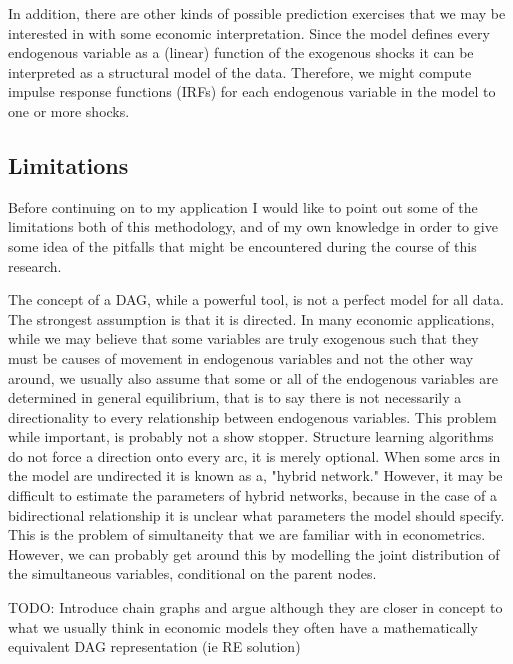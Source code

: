\documentclass{article}
\begin{document}
In addition, there are other kinds of possible prediction exercises that we may be interested in with some economic interpretation. Since the model defines every endogenous variable as a (linear) function of the exogenous shocks it can be interpreted as a structural model of the data. Therefore, we might compute impulse response functions (IRFs) for each endogenous variable in the model to one or more shocks.

\subsection{Limitations}

Before continuing on to my application I would like to point out some of the limitations both of this methodology, and of my own knowledge in order to give some idea of the pitfalls that might be encountered during the course of this research. 

The concept of a DAG, while a powerful tool, is not a perfect model for all data. The strongest assumption is that it is directed. In many economic applications, while we may believe that some variables are truly exogenous such that they must be causes of movement in endogenous variables and not the other way around, we usually also assume that some or all of the endogenous variables are determined in general equilibrium, that is to say there is not necessarily a directionality to every relationship between endogenous variables. This problem while important, is probably not a show stopper. Structure learning algorithms do not force a direction onto every arc, it is merely optional. When some arcs in the model are undirected it is known as a, "hybrid network." However, it may be difficult to estimate the parameters of hybrid networks, because in the case of a bidirectional relationship it is unclear what parameters the model should specify. This is the problem of simultaneity that we are familiar with in econometrics. However, we can probably get around this by modelling the joint distribution of the simultaneous variables, conditional on the parent nodes.

TODO: Introduce chain graphs and argue although they are closer in concept to what we usually think in economic models they often have a mathematically equivalent DAG representation (ie RE solution)
\end{document}
